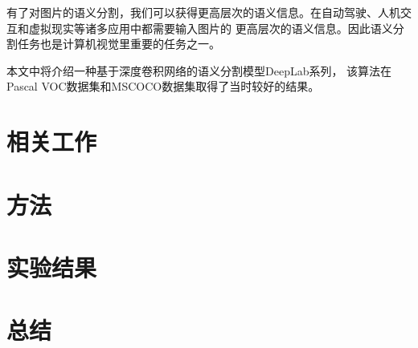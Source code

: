 \documentclass[10pt, a4paper]{article}
\begin{document}
有了对图片的语义分割，我们可以获得更高层次的语义信息。在自动驾驶、人机交互和虚拟现实等诸多应用中都需要输入图片的
更高层次的语义信息。因此语义分割任务也是计算机视觉里重要的任务之一。

本文中将介绍一种基于深度卷积网络的语义分割模型DeepLab\cite{Deeplab1,Deeplab2,Deeplab3}系列，
该算法在Pascal VOC数据集\cite{VOC}和MSCOCO数据集\cite{COCO}取得了当时较好的结果。

\section{相关工作}

\section{方法}
\section{实验结果}
\section{总结}


\newpage
{}
\nocite{*}
\printbibliography[heading=bibliography,title=参考文献]
\end{document}
